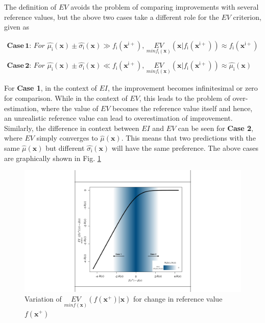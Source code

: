 The definition of $EV$ avoids the problem of comparing improvements with several reference values, but the above two cases take a different role for the $EV$ criterion, given as 

\begin{equation}
\begin{array}{l}
\mathbf{Case\,1:}\,
For \,\, \hat{\mu_{\mathsf{i}}}(\bm{x})\pm \hat{\sigma_{\mathsf{i}}}(\bm{x})\gg f_{\mathsf{i}}(\bm x^{\mathsf{i}+}), \, \underset{min f_{\mathsf{i}}(\bm{x})}{EV}(\bm{x}|f_{\mathsf{i}}(\bm x^{\mathsf{i}+}))\approx f_{\mathsf{i}}(\bm x^{\mathsf{i}+})\\
\\
\mathbf{Case\,2:}\,
For \,\, \hat{\mu_{\mathsf{i}}}(\bm{x})\pm \hat{\sigma_{\mathsf{i}}}(\bm{x}) \ll f_{\mathsf{i}}(\bm x^{\mathsf{i}+}), \, \underset{min f_{\mathsf{i}}(\bm{x})}{EV}(\bm{x}|f_{\mathsf{i}}(\bm x^{\mathsf{i}+}))\approx  \hat{\mu_{\mathsf{i}}}(\bm{x})
\end{array}
\end{equation}



For {\textbf{Case 1}}, in the context of $EI$, the improvement becomes infinitesimal or zero for comparison. While in the context of $EV$, this leads to the problem of over-estimation, where the value of $EV$ becomes the reference value itself and hence, an unrealistic reference value can lead to overestimation of improvement. Similarly, the difference in context between $EI$ and $EV$ can be seen for \textbf{Case 2}, where $EV$ simply converges to $\hat{\mu}{(\bm x)}$. This means that two predictions with the same  $\hat{\mu}{(\bm x)}$ but different  $\hat{\sigma_{\mathsf{i}}}(\bm{x})$ will have the same preference. The above cases are graphically shown in Fig. \ref{fig:cases_ev}\\

\begin{figure}[h!]
    \centering
    \includegraphics[scale=0.3]{Chapter5/Pictures/Cases_EV.pdf}
    \caption{Variation of $\underset{min f(\bm x)}{EV}(f(\bm x^+)|\bm x)$ for change in reference value $f(\bm x^+)$}
    \label{fig:cases_ev}
\end{figure}

